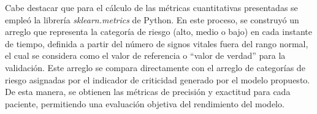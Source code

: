 Cabe destacar que para el cálculo de las métricas cuantitativas presentadas se empleó la librería \textit{sklearn.metrics} de Python. En este proceso, se construyó un arreglo que representa la categoría de riesgo (alto, medio o bajo) en cada instante de tiempo, definida a partir del número de signos vitales fuera del rango normal, el cual se considera como el valor de referencia o ``valor de verdad'' para la validación. Este arreglo se compara directamente con el arreglo de categorías de riesgo asignadas por el indicador de criticidad generado por el modelo propuesto. De esta manera, se obtienen las métricas de precisión y exactitud para cada paciente, permitiendo una evaluación objetiva del rendimiento del modelo.

\begin{table}[H]
  \centering
  \caption{Resultados cuantitativos de la validación del modelo de detección de anomalías en subespacios.}
  \label{tab:resultados_cuantitativos}
\end{table}

